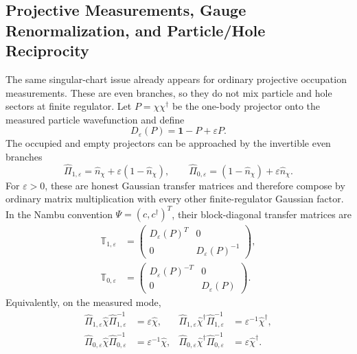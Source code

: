 \documentclass[aps,prb,onecolumn,nofootinbib,superscriptaddress]{revtex4-2}
\newcommand{\I}{\mathbf{1}}
\theoremstyle{plain}
\theoremstyle{definition}
\begin{document}
\subsection{Projective Measurements, Gauge Renormalization, and Particle/Hole
Reciprocity}
\label{sec:projector-gauge-reciprocity}

The same singular-chart issue already appears for ordinary projective
occupation measurements.  These are even branches, so they do not mix particle
and hole sectors at finite regulator.  Let \(P=\chi\chi^\dagger\) be the
one-body projector onto the measured particle wavefunction and define
\begin{equation}
  D_\varepsilon(P)=\I-P+\varepsilon P .
  \label{eq:projector-regulator-D}
\end{equation}
The occupied and empty projectors can be approached by the invertible even
branches
\begin{equation}
  \hat \Pi_{1,\varepsilon}
  =
  \hat n_\chi+\varepsilon(1-\hat n_\chi),
  \qquad
  \hat \Pi_{0,\varepsilon}
  =
  (1-\hat n_\chi)+\varepsilon\hat n_\chi .
  \label{eq:regularized-occupation-projectors}
\end{equation}
For \(\varepsilon>0\), these are honest Gaussian transfer matrices and
therefore compose by ordinary matrix multiplication with every other
finite-regulator Gaussian factor.  In the Nambu convention
\(\Psi=(c,c^\dagger)^T\), their block-diagonal transfer matrices are
\begin{align}
  \mathbb T_{1,\varepsilon}
  &=
  \begin{pmatrix}
    D_\varepsilon(P)^T & 0\\
    0 & D_\varepsilon(P)^{-1}
  \end{pmatrix},
  \label{eq:occupied-projector-nambu-transfer}\\
  \mathbb T_{0,\varepsilon}
  &=
  \begin{pmatrix}
    D_\varepsilon(P)^{-T} & 0\\
    0 & D_\varepsilon(P)
  \end{pmatrix}.
  \label{eq:empty-projector-nambu-transfer}
\end{align}
Equivalently, on the measured mode,
\begin{align}
  \hat \Pi_{1,\varepsilon}\hat\chi
  \hat \Pi_{1,\varepsilon}^{-1}
  &=
  \varepsilon\hat\chi,
  &
  \hat \Pi_{1,\varepsilon}\hat\chi^\dagger
  \hat \Pi_{1,\varepsilon}^{-1}
  &=
  \varepsilon^{-1}\hat\chi^\dagger,
  \label{eq:occupied-projector-mode-action}\\
  \hat \Pi_{0,\varepsilon}\hat\chi
  \hat \Pi_{0,\varepsilon}^{-1}
  &=
  \varepsilon^{-1}\hat\chi,
  &
  \hat \Pi_{0,\varepsilon}\hat\chi^\dagger
  \hat \Pi_{0,\varepsilon}^{-1}
  &=
  \varepsilon\hat\chi^\dagger .
  \label{eq:empty-projector-mode-action}
\end{align}
\end{document}
